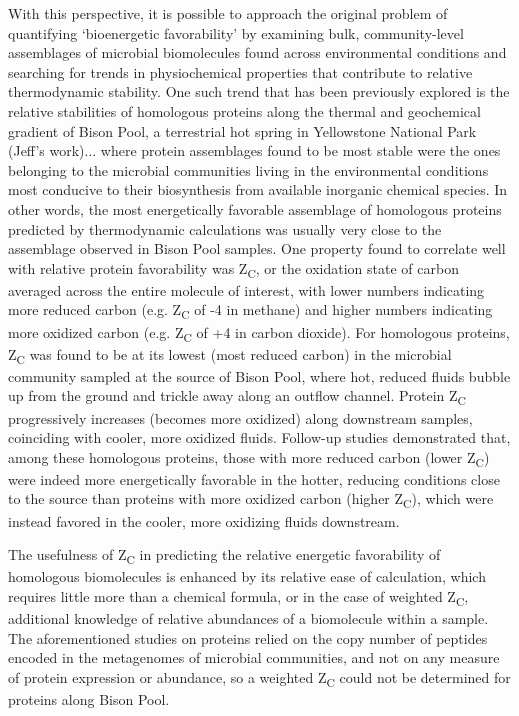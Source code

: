 With this perspective, it is possible to approach the original problem of quantifying `bioenergetic favorability' by examining bulk, community-level assemblages of microbial biomolecules found across environmental conditions and searching for trends in physiochemical properties that contribute to relative thermodynamic stability. One such trend that has been previously explored is the relative stabilities of homologous proteins along the thermal and geochemical gradient of Bison Pool, a terrestrial hot spring in Yellowstone National Park (Jeff's work)... where protein assemblages found to be most stable were the ones belonging to the microbial communities living in the environmental conditions most conducive to their biosynthesis from available inorganic chemical species. In other words, the most energetically favorable assemblage of homologous proteins predicted by thermodynamic calculations was usually very close to the assemblage observed in Bison Pool samples. One property found to correlate well with relative protein favorability was Z\textsubscript{C}, or the oxidation state of carbon averaged across the entire molecule of interest, with lower numbers indicating more reduced carbon (e.g. Z\textsubscript{C} of -4 in methane) and higher numbers indicating more oxidized carbon (e.g. Z\textsubscript{C} of +4 in carbon dioxide). For homologous proteins, Z\textsubscript{C} was found to be at its lowest (most reduced carbon) in the microbial community sampled at the source of Bison Pool, where hot, reduced fluids bubble up from the ground and trickle away along an outflow channel. Protein Z\textsubscript{C} progressively increases (becomes more oxidized) along downstream samples, coinciding with cooler, more oxidized fluids. Follow-up studies demonstrated that, among these homologous proteins, those with more reduced carbon (lower Z\textsubscript{C}) were indeed more energetically favorable in the hotter, reducing conditions close to the source than proteins with more oxidized carbon (higher Z\textsubscript{C}), which were instead favored in the cooler, more oxidizing fluids downstream.

The usefulness of Z\textsubscript{C} in predicting the relative energetic favorability of homologous biomolecules is enhanced by its relative ease of calculation, which requires little more than a chemical formula, or in the case of weighted Z\textsubscript{C}, additional knowledge of relative abundances of a biomolecule within a sample. The aforementioned studies on proteins relied on the copy number of peptides encoded in the metagenomes of microbial communities, and not on any measure of protein expression or abundance, so a weighted Z\textsubscript{C} could not be determined for proteins along Bison Pool.

